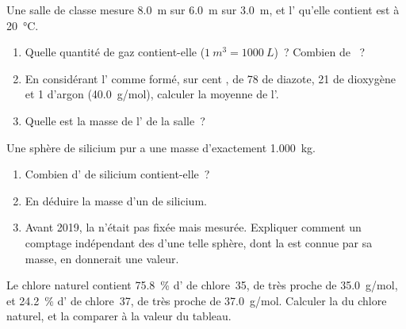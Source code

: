 \begin{exercise}[$\star\star\star$]\label{exo:g10:the-mole:13}
Une salle de classe mesure \qty{8.0}{m} sur \qty{6.0}{m} sur
\qty{3.0}{m}, et l' qu'elle contient est à \qty{20}{\celsius}.
\begin{enumerate}
  \item Quelle quantité de gaz contient-elle
        ($\qty{1}{m^3} =
        \qty{1000}{L}$)~? Combien de ~?
  \item En considérant l' comme formé, sur cent , de 78
         de diazote, 21 de dioxygène et 1 d'argon
        (\qty{40.0}{g/mol}), calculer la  moyenne de
        l'.
  \item Quelle est la masse de l' de la salle~?
\end{enumerate}
\end{exercise}

\begin{exercise}[$\star\star\star$]\label{exo:g10:the-mole:14}
Une sphère de silicium pur a une masse d'exactement \qty{1.000}{kg}.
\begin{enumerate}
  \item Combien d' de silicium contient-elle~?
  \item En déduire la masse d'un  de silicium.
  \item Avant 2019, la  n'était pas fixée mais
        mesurée. Expliquer comment un comptage indépendant des 
        d'une telle sphère, dont la  est connue par sa
        masse, en donnerait une valeur.
\end{enumerate}
\end{exercise}

\begin{exercise}[$\star\star\star$]\label{exo:g10:the-mole:15}
Le chlore naturel contient \qty{75.8}{\percent} d' de chlore~35,
de  très proche de \qty{35.0}{g/mol}, et
\qty{24.2}{\percent} d' de chlore~37, de  très proche
de \qty{37.0}{g/mol}. Calculer la  du chlore
naturel, et la comparer à la valeur du tableau.
\end{exercise}

